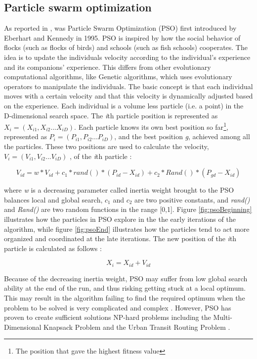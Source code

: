 \subsection{Particle swarm optimization}
\label{subsec:pso}
As reported in \citet{shi99}, was Particle Swarm Optimization (PSO) first introduced by Eberhart and Kennedy in 1995. PSO is inspired by how the social behavior of flocks (such as flocks of birds) and schools (such as fish schools) cooperates. The idea is to update the individuals velocity according to the individual's experience and its companions' experience. This differs from other evolutionary computational algorithms, like Genetic algorithms, which uses evolutionary operators to manipulate the individuals. The basic concept is that each individual moves with a certain velocity and that this velocity is dynamically adjusted based on the experience. Each individual is a volume less particle (i.e. a point) in the D-dimensional search space. The \textit{i}th particle position is represented as $X_i = (X_{i1},X_{i2}...X_{iD})$. Each particle knows its own best position so far\footnote{The position that gave the highest fitness value}, represented as $P_i = (P_{i1},P_{i2}...P_{iD})$, and the best position \textit{g}, achieved among all the particles. These two positions are used to calculate the velocity, $V_i = (V_{i1},V_{i2}...V_{iD})$ ,  of the \textit{i}th particle \citep{shi99}: 

$$V_{id} = w * V_{id} + c_1 * rand() * (P_{id}-X_{id}) + c_2 * Rand() * (P_{gd}-X_{id})$$

where \textit{w} is a decreasing parameter called inertia weight brought to the PSO balances local and global search, $c_1$ and $c_2$ are two positive constants, and \textit{rand()} and \textit{Rand()} are two random functions in the range [0,1]. Figure \ref{fig:psoBeginning} illustrates how the particles in PSO explore in the the early iterations of the algorithm, while figure \ref{fig:psoEnd} illustrates how the particles tend to act more organized and coordinated at the late iterations. The new position of the \textit{i}th particle is calculated as follows \citep{shi99}:

$$X_i = X_{id} + V_{id}$$

Because of the decreasing inertia weight, PSO may suffer from low global search ability at the end of the run, and thus risking getting stuck at a local optimum. This may result in the algorithm failing to find the required optimum when the problem to be solved is very complicated and complex \citep{shi99}. However, PSO has proven to create sufficient solutions NP-hard problems including the Multi-Dimensional Knapsack Problem \citep{wan09} and the Urban Transit Routing Problem \citep{kechagiopoulos14}. 

